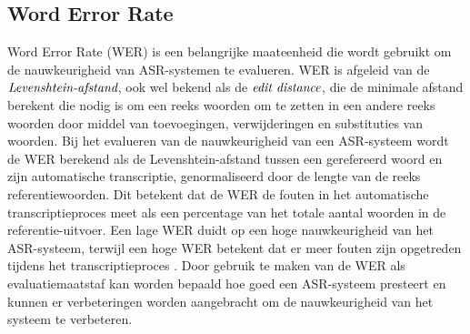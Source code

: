 \subsection{Word Error Rate}
Word Error Rate (WER) is een belangrijke maateenheid die wordt gebruikt om de nauwkeurigheid van ASR-systemen te evalueren. WER is afgeleid van de $\emph{Levenshtein-afstand}$, ook wel bekend als de $\emph{edit distance}$, die de minimale afstand berekent die nodig is om een reeks woorden om te zetten in een andere reeks woorden door middel van toevoegingen, verwijderingen en substituties van woorden. Bij het evalueren van de nauwkeurigheid van een ASR-systeem wordt de WER berekend als de Levenshtein-afstand tussen een gerefereerd woord en zijn automatische transcriptie, genormaliseerd door de lengte van de reeks referentiewoorden. Dit betekent dat de WER de fouten in het automatische transcriptieproces meet als een percentage van het totale aantal woorden in de referentie-uitvoer. Een lage WER duidt op een hoge nauwkeurigheid van het ASR-systeem, terwijl een hoge WER betekent dat er meer fouten zijn opgetreden tijdens het transcriptieproces \autocite{mccowan2004use}. Door gebruik te maken van de WER als evaluatiemaatstaf kan worden bepaald hoe goed een ASR-systeem presteert en kunnen er verbeteringen worden aangebracht om de nauwkeurigheid van het systeem te verbeteren. \\

